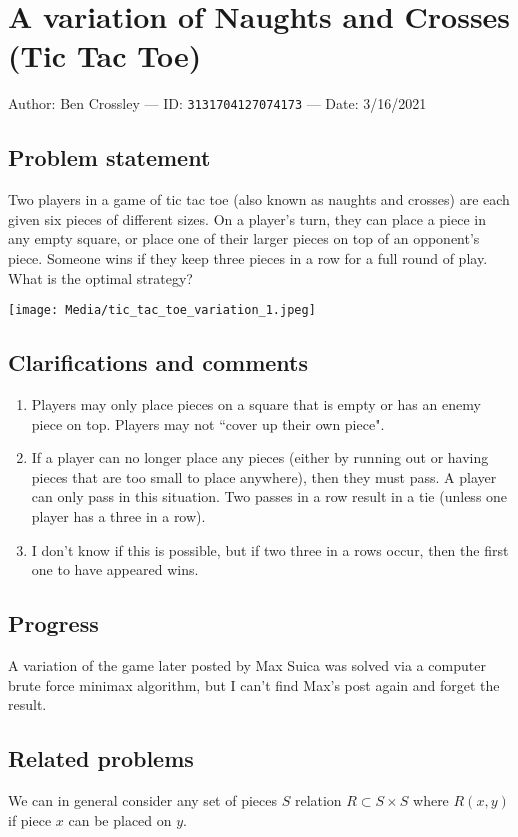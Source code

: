 
\section{A variation of Naughts and Crosses (Tic Tac Toe)}

Author: Ben Crossley --- ID: \verb`3131704127074173` --- Date: 3/16/2021

\subsection{Problem statement}

Two players in a game of tic tac toe (also known as naughts and crosses) are each given six pieces of different sizes. On a player's turn, they can place a piece in any empty square, or place one of their larger pieces on top of an opponent's piece. Someone wins if they keep three pieces in a row for a full round of play. What is the optimal strategy?

\texttt{[image: Media/tic\_tac\_toe\_variation\_1.jpeg]}

\subsection{Clarifications and comments}

\begin{enumerate}
  \item Players may only place pieces on a square that is empty or has an enemy piece on top. Players may not ``cover up their own piece".
  \item If a player can no longer place any pieces (either by running out or having pieces that are too small to place anywhere), then they must pass. A player can only pass in this situation. Two passes in a row result in a tie (unless one player has a three in a row).
  \item I don't know if this is possible, but if two three in a rows occur, then the first one to have appeared wins.
\end{enumerate}

\subsection{Progress}

A variation of the game later posted by Max Suica was solved via a computer brute force minimax algorithm, but I can't find Max's post again and forget the result.

\subsection{Related problems}

We can in general consider any set of pieces $S$ relation $R\subset S\times S$ where $R(x,y)$ if piece $x$ can be placed on $y$.

